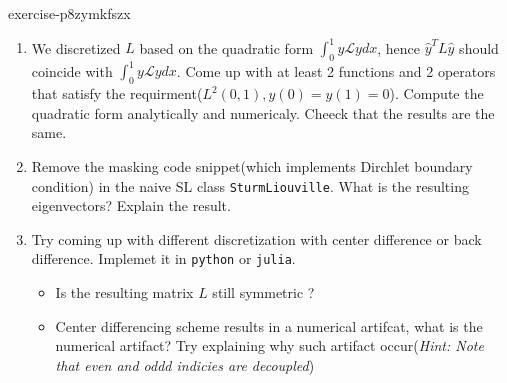 \begin{mystexercise}{}{exercise-p8zymkfszx}\label{exercise-p8ZYMkFsZx}\label{exercise-p8zymkfszx}\begin{enumerate}
\item We discretized $L$ based on the quadratic form $\int_0^1 y\mathcal L y dx$, hence $\hat y^T L\hat y$ should coincide with $\int_0^1 y\mathcal L y dx$. Come up with at least 2 functions and 2 operators that satisfy the requirment($L^2(0,1),y(0)=y(1)=0$). Compute the quadratic form analytically and numericaly. Cheeck that the results are the same.
\item Remove the masking code snippet(which implements Dirchlet boundary condition) in the naive SL class \texttt{SturmLiouville}. What is the resulting eigenvectors? Explain the result.
\item Try coming up with different discretization with center difference or back difference. Implemet it in \texttt{python}
or \texttt{julia}.

\begin{itemize}
\item Is the resulting matrix $L$ still symmetric ?
\item Center differencing scheme results in a numerical artifcat, what is the numerical artifact? Try explaining why such artifact occur(\textit{Hint: Note that even and oddd indicies are decoupled})
\end{itemize}
\end{enumerate}

\end{mystexercise}
%  
% 
%